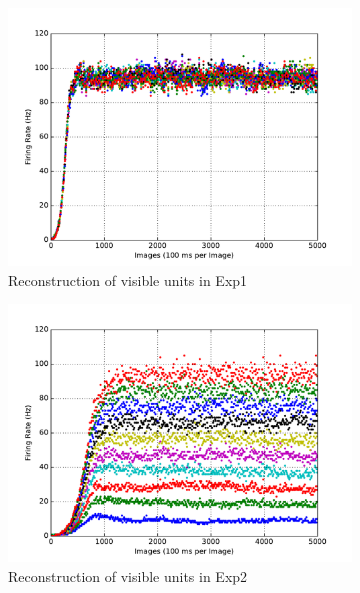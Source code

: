 \begin{figure}
\begin{subfigure}[t]{0.4\textwidth}
		\includegraphics[width=\textwidth]{pics_sdlm/17_exp_SRBM_all_long/exp1_recon_s.pdf}
		\caption{Reconstruction of visible units in Exp1}
	\end{subfigure}
	\begin{subfigure}[t]{0.4\textwidth}
		\includegraphics[width=\textwidth]{pics_sdlm/17_exp_SRBM_all_long/exp2_recon_s.pdf}
		\caption{Reconstruction of visible units in Exp2}
	\end{subfigure}\\
	\begin{subfigure}[t]{0.4\textwidth}

\end{subfigure}
\end{figure}
